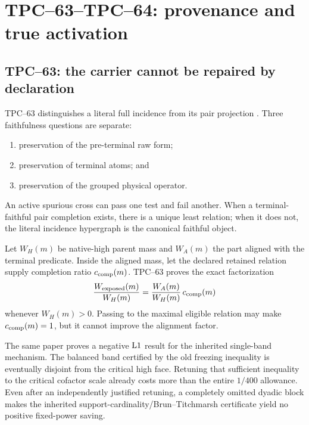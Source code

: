 \section{TPC--63--TPC--64: provenance and true activation}
\label{sec:provenance-activation}

\subsection{TPC--63: the carrier cannot be repaired by declaration}

TPC--63 distinguishes a literal full incidence from its pair projection
\citep{WangTPC63}.  Three faithfulness questions are separate:
\begin{enumerate}[label=\textup{(\roman*)},leftmargin=3em]
 \item preservation of the pre-terminal raw form;
 \item preservation of terminal atoms; and
 \item preservation of the grouped physical operator.
\end{enumerate}
An active spurious cross can pass one test and fail another.  When a
terminal-faithful pair completion exists, there is a unique least relation;
when it does not, the literal incidence hypergraph is the canonical faithful
object.

Let \(W_H(m)\) be native-high parent mass and \(W_A(m)\) the part aligned
with the terminal predicate.  Inside the aligned mass, let the declared
retained relation supply completion ratio \(c_{\rm comp}(m)\).  TPC--63
proves the exact factorization
\begin{equation}
 \frac{W_{\rm exposed}(m)}{W_H(m)}
 =
 \frac{W_A(m)}{W_H(m)}\,c_{\rm comp}(m)
 \label{eq:tpc72-exposure-factorization}
\end{equation}
whenever \(W_H(m)>0\).  Passing to the maximal eligible relation may make
\(c_{\rm comp}(m)=1\), but it cannot improve the alignment factor.

The same paper proves a negative \(\mathrm{L1}\) result for the inherited
single-band mechanism.  The balanced band certified by the old freezing
inequality is eventually disjoint from the critical high face.  Retuning
that sufficient inequality to the critical cofactor scale already costs
more than the entire \(1/400\) allowance.  Even after an independently
justified retuning, a completely omitted dyadic block makes the inherited
support-cardinality/Brun--Titchmarsh certificate yield no positive
fixed-power saving.

